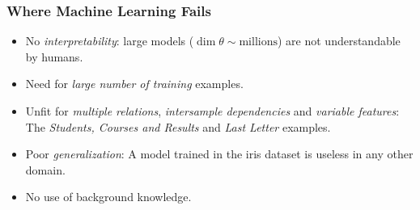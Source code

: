 \documentclass[bigger,xcolor={x11names,svgnames}]{beamer}
\begin{document}
%
\begin{frame}
    \frametitle{Where Machine Learning Fails}
    \begin{itemize}
        \item No \emph{interpretability}: large models ($\dim \theta \sim \text{millions}$) are \alert{not understandable by humans}.
        \item Need for \emph{large number of training} examples.
        \item Unfit for \emph{multiple relations}, \emph{intersample dependencies} and \emph{variable features}: The \textit{Students, Courses and Results} and \emph{Last Letter} examples.
        \item Poor \emph{generalization}: A model trained in the iris dataset is useless in any other domain.
        \item \alert{No use of background knowledge}.
    \end{itemize}
\end{frame}
%
%
\end{document}
